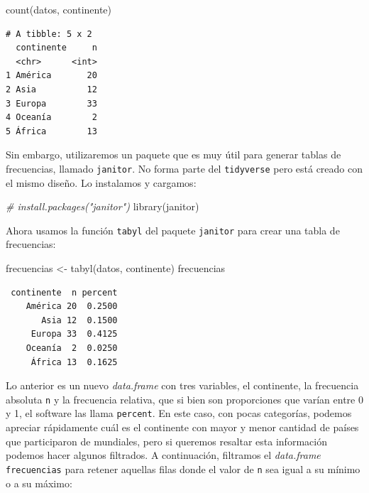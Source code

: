 \documentclass[
]{book}
\newenvironment{Shaded}{\begin{snugshade}}{\end{snugshade}}
\newcommand{\CommentTok}[1]{\textcolor[rgb]{0.56,0.35,0.01}{\textit{#1}}}
\newcommand{\FunctionTok}[1]{\textcolor[rgb]{0.00,0.00,0.00}{#1}}
\newcommand{\NormalTok}[1]{#1}
\newcommand{\OtherTok}[1]{\textcolor[rgb]{0.56,0.35,0.01}{#1}}
\begin{document}
\begin{Shaded}
\begin{Highlighting}[]
\FunctionTok{count}\NormalTok{(datos, continente)}
\end{Highlighting}
\end{Shaded}

\begin{verbatim}
# A tibble: 5 x 2
  continente     n
  <chr>      <int>
1 América       20
2 Asia          12
3 Europa        33
4 Oceanía        2
5 África        13
\end{verbatim}

Sin embargo, utilizaremos un paquete que es muy útil para generar tablas de frecuencias, llamado \texttt{janitor}. No forma parte del \texttt{tidyverse} pero está creado con el mismo diseño. Lo instalamos y cargamos:

\begin{Shaded}
\begin{Highlighting}[]
\CommentTok{\# install.packages("janitor")}
\FunctionTok{library}\NormalTok{(janitor)}
\end{Highlighting}
\end{Shaded}

Ahora usamos la función \texttt{tabyl} del paquete \texttt{janitor} para crear una tabla de frecuencias:

\begin{Shaded}
\begin{Highlighting}[]
\NormalTok{frecuencias }\OtherTok{\textless{}{-}} \FunctionTok{tabyl}\NormalTok{(datos, continente)}
\NormalTok{frecuencias}
\end{Highlighting}
\end{Shaded}

\begin{verbatim}
 continente  n percent
    América 20  0.2500
       Asia 12  0.1500
     Europa 33  0.4125
    Oceanía  2  0.0250
     África 13  0.1625
\end{verbatim}

Lo anterior es un nuevo \emph{data.frame} con tres variables, el continente, la frecuencia absoluta \texttt{n} y la frecuencia relativa, que si bien son proporciones que varían entre 0 y 1, el software las llama \texttt{percent}. En este caso, con pocas categorías, podemos apreciar rápidamente cuál es el continente con mayor y menor cantidad de países que participaron de mundiales, pero si queremos resaltar esta información podemos hacer algunos filtrados. A continuación, filtramos el \emph{data.frame} \texttt{frecuencias} para retener aquellas filas donde el valor de \texttt{n} sea igual a su mínimo o a su máximo:
\end{document}

